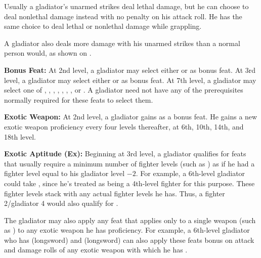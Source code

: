 Usually a gladiator's unarmed strikes deal lethal damage, but he can choose to deal nonlethal damage instead with no penalty on his attack roll. He has the same choice to deal lethal or nonlethal damage while grappling.

A gladiator also deals more damage with his unarmed strikes than a normal person would, as shown on .


\textbf{Bonus Feat:} At 2nd level, a gladiator may select either  or  as bonus feat. At 3rd level, a gladiator may select either  or  as bonus feat. At 7th level, a gladiator may select one of , , , , , , , or . A gladiator need not have any of the prerequisites normally required for these feats to select them.

\textbf{Exotic Weapon:} At 2nd level, a gladiator gains  as a bonus feat. He gains a new exotic weapon proficiency every four levels thereafter, at 6th, 10th, 14th, and 18th level.

\textbf{Exotic Aptitude (Ex):} Beginning at 3rd level, a gladiator qualifies for feats that usually require a minimum number of fighter levels (such as ) as if he had a fighter level equal to his gladiator level $-2$. For example, a 6th-level gladiator could take , since he's treated as being a 4th-level fighter for this purpose. These fighter levels stack with any actual fighter levels he has. Thus, a fighter 2/gladiator 4 would also qualify for .

The gladiator may also apply any feat that applies only to a single weapon (such as ) to any exotic weapon he has proficiency. For example, a 6th-level gladiator who has  (longsword) and  (longsword) can also apply these feats bonus on attack and damage rolls of any exotic weapon with which he has .

